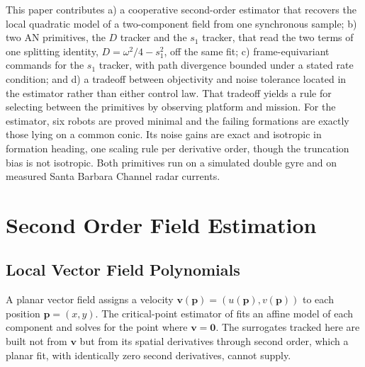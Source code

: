\documentclass[lettersize,journal]{IEEEtran}
\begin{document}
This paper contributes a) a cooperative second-order estimator that
recovers the local quadratic model of a two-component field from one
synchronous sample; b) two AN primitives, the $D$ tracker and the $s_1$
tracker, that read the two terms of one splitting identity, $D =
\omega^2/4 - s_1^2$, off the same fit; c) frame-equivariant commands
for the $s_1$ tracker, with path divergence bounded under a stated rate
condition; and d) a tradeoff between objectivity and noise tolerance
located in the estimator rather than either control law. That tradeoff
yields a rule for selecting between the primitives by observing
platform and mission.
For the estimator, six robots are proved minimal and the failing
formations are exactly those lying on a common conic. Its noise gains
are exact and isotropic in formation heading, one scaling rule per
derivative order, though the truncation bias is not isotropic. Both
primitives run on a simulated double gyre and on measured Santa Barbara
Channel radar currents.


\section{Second Order Field Estimation}

\subsection{Local Vector Field Polynomials}

A planar vector field assigns a velocity $\mathbf{v}(\mathbf{p}) =
(u(\mathbf{p}), v(\mathbf{p}))$ to each position $\mathbf{p} = (x, y)$.
The critical-point estimator of \cite{8} fits an affine model of each
component and solves for the point where $\mathbf{v} = \mathbf{0}$. The
surrogates tracked here are built not from $\mathbf{v}$ but from its
spatial derivatives through second order, which a planar fit, with
identically zero second derivatives, cannot supply.
\end{document}
